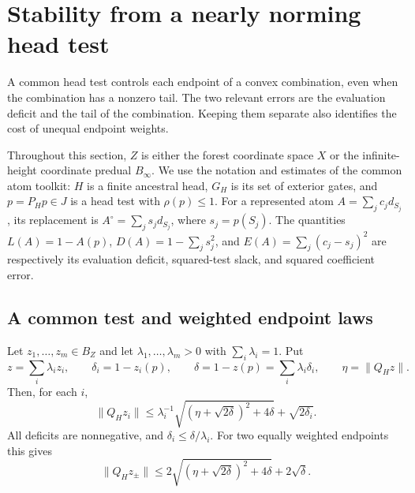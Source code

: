 \section{Stability from a nearly norming head test}\label{stab:section}

A common head test controls each endpoint of a convex combination,
even when the combination has a nonzero tail.  The two relevant errors
are the evaluation deficit and the tail of the combination.  Keeping
them separate also identifies the cost of unequal endpoint weights.

Throughout this section, $Z$ is either the forest coordinate space
$X$ or the infinite-height coordinate predual $B_\infty$.  We use the
notation and estimates of the common atom toolkit: $H$ is a finite
ancestral head, $G_H$ is its set of exterior gates, and $p=P_Hp\in J$
is a head test with $\rho(p)\le1$.  For a represented atom
$A=\sum_jc_jd_{S_j}$, its replacement is
$A^\circ=\sum_js_jd_{S_j}$, where $s_j=p(S_j)$.  The quantities
$L(A)=1-A(p)$, $D(A)=1-\sum_js_j^2$, and
$E(A)=\sum_j(c_j-s_j)^2$ are respectively its evaluation deficit,
squared-test slack, and squared coefficient error.

\subsection{A common test and weighted endpoint laws}

\begin{theorem}\label{stab:weighted}
Let $z_1,\ldots,z_m\in B_Z$ and let
$\lambda_1,\ldots,\lambda_m>0$ with $\sum_i\lambda_i=1$.  Put
\[
 z=\sum_i\lambda_i z_i,\qquad
 \delta_i=1-z_i(p),\qquad
 \delta=1-z(p)=\sum_i\lambda_i\delta_i,
 \qquad \eta=\|Q_Hz\|.
\]
Then, for each $i$,
\begin{equation}\label{stab:weighted-bound}
 \|Q_Hz_i\|
 \le\lambda_i^{-1}
       \sqrt{(\eta+\sqrt{2\delta})^2+4\delta}
       +\sqrt{2\delta_i}.
\end{equation}
All deficits are nonnegative, and $\delta_i\le\delta/\lambda_i$.
For two equally weighted endpoints this gives
\begin{equation}\label{stab:nonzero-midpoint}
 \|Q_Hz_\pm\|
 \le2\sqrt{(\eta+\sqrt{2\delta})^2+4\delta}+2\sqrt\delta.
\end{equation}
\end{theorem}

